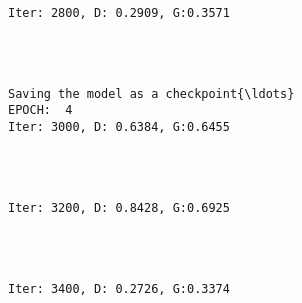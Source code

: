 \documentclass[11pt]{article}
\begin{document}
    \begin{Verbatim}[commandchars=\\\{\}]

Iter: 2800, D: 0.2909, G:0.3571
    \end{Verbatim}

    \begin{center}
    \end{center}
    { \hspace*{\fill} \\}
    
    \begin{Verbatim}[commandchars=\\\{\}]

Saving the model as a checkpoint{\ldots}
EPOCH:  4
Iter: 3000, D: 0.6384, G:0.6455
    \end{Verbatim}

    \begin{center}
    \end{center}
    { \hspace*{\fill} \\}
    
    \begin{Verbatim}[commandchars=\\\{\}]

Iter: 3200, D: 0.8428, G:0.6925
    \end{Verbatim}

    \begin{center}
    \end{center}
    { \hspace*{\fill} \\}
    
    \begin{Verbatim}[commandchars=\\\{\}]

Iter: 3400, D: 0.2726, G:0.3374
    \end{Verbatim}

    \begin{center}
    \end{center}
    { \hspace*{\fill} \\}
    
\end{document}
